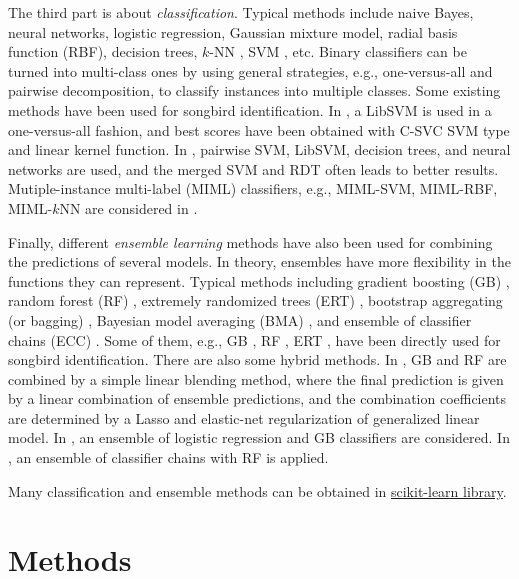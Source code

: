\documentclass{article} %
\begin{document}
The third part is about {\em classification}. Typical methods include naive Bayes, neural networks, logistic regression, Gaussian mixture model, radial basis function (RBF), decision trees, $k$-NN \cite{cover1967nearest}, SVM \cite{cortes1995support}, etc. Binary classifiers can be turned into multi-class ones by using general strategies, e.g., one-versus-all and pairwise decomposition, to classify instances into multiple classes. 
Some existing methods have been used for songbird identification. In \cite{dufour2013clusterized}, a LibSVM is used in a one-versus-all fashion, and best scores have been obtained with C-SVC SVM type and linear kernel function. In \cite{mencialearning2013}, pairwise SVM, LibSVM, decision trees, and neural networks are used, and the merged SVM and RDT often leads to better results. Mutiple-instance multi-label (MIML) classifiers, e.g., MIML-SVM, MIML-RBF, MIML-$k$NN are considered in \cite{mlsp1}. 

Finally, different {\em ensemble learning} methods have also been used for combining the predictions of several models. In theory, ensembles have more flexibility in the functions they can represent. Typical methods including gradient boosting (GB) \cite{friedman2001greedy}, random forest (RF) \cite{breiman2001random}, extremely randomized trees (ERT) \cite{geurts2006extremely}, bootstrap aggregating (or bagging) \cite{breiman1996bagging}, Bayesian model averaging (BMA) \cite{hoeting1999bayesian}, and ensemble of classifier chains (ECC) \cite{read2011classifier}. Some of them, e.g., GB \cite{chennovel13}, RF \cite{Stowell_NIPSW13,chennovel13,fodor2013ninth}, 
ERT \cite{Lasseck13}, have been directly used for songbird identification. There are also some hybrid methods. In \cite{chennovel13}, GB and RF are combined by a simple linear blending method, where the final prediction is given by a linear combination of ensemble predictions, and the combination coefficients are determined by a Lasso and elastic-net regularization of generalized linear model. In \cite{Massaron13}, an ensemble of logistic regression and GB classifiers are considered. In \cite{mlsp2}, an ensemble of classifier chains with RF is applied.

Many classification and ensemble methods can be obtained in \href{http://scikit-learn.org}{scikit-learn library}. 

\section{Methods}
\end{document}
